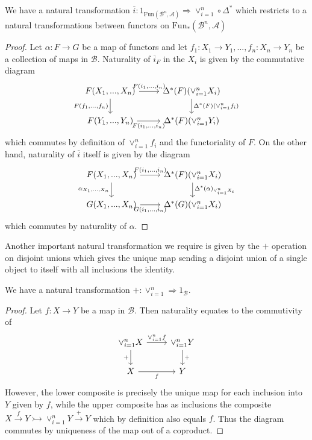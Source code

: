 \begin{lem}[label=lem:compIncNat]
    We have a natural transformation $\overline{i}:1_{\text{Fun}(\mathcal{B}^n,\mathcal{A})}\Rightarrow \lor_{i=1}^n\circ \Delta^*$ which restricts to a natural transformations between functors on $\text{Fun}_*(\mathcal{B}^n,\mathcal{A})$
\end{lem}
\begin{proof}
    Let $\alpha:F\rightarrow G$ be a map of functors and let $f_1:X_1\rightarrow Y_1,...,f_n:X_n\rightarrow Y_n$ be a collection of maps in $\mathcal{B}$. Naturality of $\overline{i}_F$ in the $X_i$ is given by the commutative diagram
    \[\begin{tikzcd}
    	{F(X_1,...,X_n)} & {\Delta^*(F)(\lor_{i=1}^nX_i)} \\
    	{F(Y_1,...,Y_n)} & {\Delta^*(F)(\lor_{i=1}^nY_i)}
    	\arrow["{F(i_1,...,i_n)}", from=1-1, to=1-2]
    	\arrow["{\Delta^*(F)(\lor_{i=1}^nf_i)}", from=1-2, to=2-2]
    	\arrow["{F(f_1,...,f_n)}"', from=1-1, to=2-1]
    	\arrow["{F(i_1,...,i_n)}"', from=2-1, to=2-2]
    \end{tikzcd}\]
    which commutes by definition of $\lor_{i=1}^nf_i$ and the functoriality of $F$. On the other hand, naturality of $\overline{i}$ itself is given by the diagram
    \[\begin{tikzcd}
    	{F(X_1,...,X_n)} & {\Delta^*(F)(\lor_{i=1}^nX_i)} \\
    	{G(X_1,...,X_n)} & {\Delta^*(G)(\lor_{i=1}^nX_i)}
    	\arrow["{F(i_1,...,i_n)}", from=1-1, to=1-2]
    	\arrow["{\Delta^*(\alpha)_{\lor_{i=1}^nX_i}}", from=1-2, to=2-2]
    	\arrow["{\alpha_{X_1,...,X_n}}"', from=1-1, to=2-1]
    	\arrow["{G(i_1,...,i_n)}"', from=2-1, to=2-2]
    \end{tikzcd}\]
    which commutes by naturality of $\alpha$.
\end{proof}
Another important natural transformation we require is given by the $+$ operation on disjoint unions which gives the unique map sending a disjoint union of a single object to itself with all inclusions the identity.
\begin{lem}[label=lem:plusNat]
    We have a natural transformation $+:\lor_{i=1}^n\Rightarrow 1_{\mathcal{B}}$.
\end{lem}
\begin{proof}
    Let $f:X\rightarrow Y$ be a map in $\mathcal{B}$. Then naturality equates to the commutivity of
    \[\begin{tikzcd}
    	{\lor_{i=1}^nX} & {\lor_{i=1}^nY} \\
    	X & Y
    	\arrow["{\lor_{i=1}^nf}", from=1-1, to=1-2]
    	\arrow["{+}"', from=1-1, to=2-1]
    	\arrow["{+}", from=1-2, to=2-2]
    	\arrow["f"', from=2-1, to=2-2]
    \end{tikzcd}\]
    However, the lower composite is precisely the unique map for each inclusion into $Y$ given by $f$, while the upper composite has as inclusions the composite $X\xrightarrow{f}Y\rightarrowtail \lor_{i=1}^nY\xrightarrow{+}Y$ which by definition also equals $f$. Thus the diagram commutes by uniqueness of the map out of a coproduct.
\end{proof}

